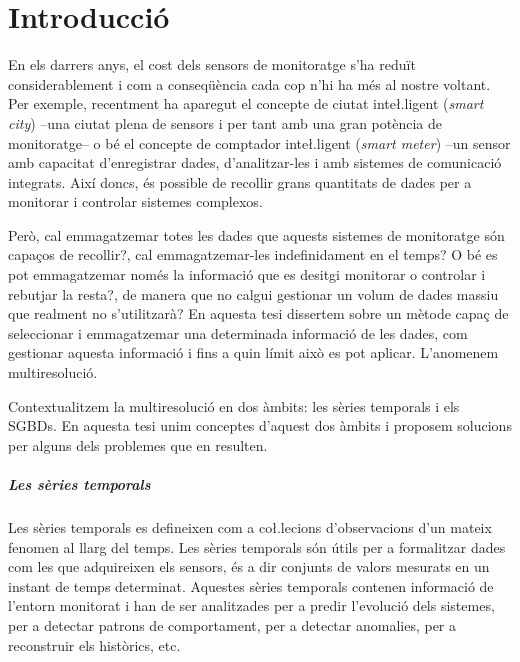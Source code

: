 

\chapter{Introducció}
\label{sec:intro}

En els darrers anys, el cost dels sensors de monitoratge s'ha reduït
considerablement i com a conseqüència cada cop n'hi ha més al nostre
voltant.  Per exemple, recentment ha aparegut el concepte de ciutat
inte\l.ligent (\emph{smart city}) --una ciutat plena de sensors i per
tant amb una gran potència de monitoratge-- o bé el concepte de
comptador inte\l.ligent (\emph{smart meter}) --un sensor amb capacitat
d'enregistrar dades, d'analitzar-les i amb sistemes de comunicació
integrats. Així doncs, és possible de recollir grans quantitats de
dades per a monitorar i controlar sistemes complexos. 

Però, cal emmagatzemar totes les dades que aquests sistemes de
monitoratge són capaços de recollir?, cal emmagatzemar-les
indefinidament en el temps? O bé es pot emmagatzemar només la
informació que es desitgi monitorar o controlar i rebutjar la resta?,
de manera que no calgui gestionar un volum de dades massiu que
realment no s'utilitzarà? En aquesta tesi dissertem sobre un mètode
capaç de seleccionar i emmagatzemar una determinada informació de les
dades, com gestionar aquesta informació i fins a quin límit això es pot
aplicar. L'anomenem multiresolució.


Contextualitzem la multiresolució en dos àmbits: les sèries temporals
i els \glspl{SGBD}. En aquesta tesi unim conceptes d'aquest dos àmbits
i proposem solucions per alguns dels problemes que en resulten.



\paragraph{Les sèries temporals}
Les sèries temporals es defineixen com a co\l.lecions d'observacions
d'un mateix fenomen al llarg del temps.  Les sèries temporals són
útils per a formalitzar dades com les que adquireixen els sensors, és
a dir conjunts de valors mesurats en un instant de temps
determinat. Aquestes sèries temporals contenen informació de l'entorn
monitorat i han de ser analitzades per a predir l'evolució dels
sistemes, per a detectar patrons de comportament, per a detectar
anomalies, per a reconstruir els històrics, etc.


